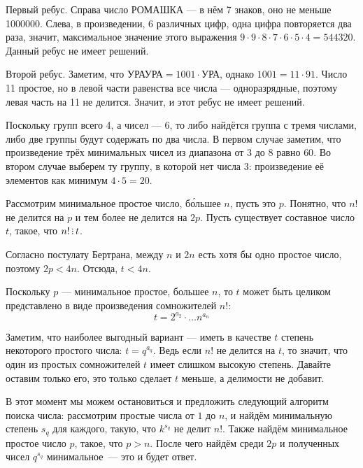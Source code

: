 \begin{itemize}
\itA Первый ребус. Справа число РОМАШКА --- в нём 7 знаков, оно не меньше 1000000.
Слева, в произведении, 6 различных цифр, одна цифра повторяется два раза, значит, максимальное
значение этого выражения $9\cdot 9 \cdot 8 \cdot 7 \cdot 6 \cdot 5 \cdot 4 = 544320$.
Данный ребус не имеет решений.

Второй ребус. Заметим, что $\text{УРАУРА} = 1001 \cdot \text{УРА}$, однако $1001 = 11 \cdot 91$.
Число 11 простое, но в левой части равенства все числа --- одноразрядные, поэтому левая часть
на 11 не делится. Значит, и этот ребус не имеет решений.

\itB Поскольку групп всего 4, а чисел --- 6, то либо найдётся группа с тремя числами, либо две
группы будут содержать по два числа. В первом случае заметим, что произведение трёх минимальных
чисел из диапазона от 3 до 8 равно $60$. Во втором случае выберем ту группу, в которой нет 
числа 3: произведение её элементов как минимум $4 \cdot 5 = 20$.

\itC Рассмотрим минимальное простое число, б\'ольшее $n$, пусть это $p$.
Понятно, что $n!$ не делится на $p$ и тем более не делится на $2p$. 
Пусть существует составное число $t$, такое, что $n! \divsby t$.

Согласно постулату Бертрана, между $n$ и $2n$ есть хотя бы одно простое число,
поэтому $2p < 4n$. Отсюда, $t < 4n$. 

Поскольку $p$ --- минимальное простое, большее $n$, то $t$ может быть целиком
представлено в виде произведения сомножителей $n!$: 
$$t = 2^{a_2} \cdot \ldots n^{a_n}$$

Заметим, что наиболее выгодный вариант --- иметь в качестве $t$ степень некоторого
простого числа: $t = q^{a_q}$. Ведь если $n!$ не делится на $t$, то значит, что один
из простых сомножителей $t$ имеет слишком высокую степень. Давайте оставим только его,
это только сделает $t$ меньше, а делимости не добавит.

В этот момент мы можем остановиться и предложить следующий алгоритм поиска 
числа: рассмотрим простые числа от $1$ до $n$, и найдём минимальную степень 
$s_q$ для каждого, такую, что $k^{s_q}$ не делит $n!$. Также найдём минимальное
простое число $p$, такое, что $p > n$. После чего найдём среди $2p$ и полученных
чисел $q^{s_q}$ минимальное~— это и будет ответ.



\end{itemize}
